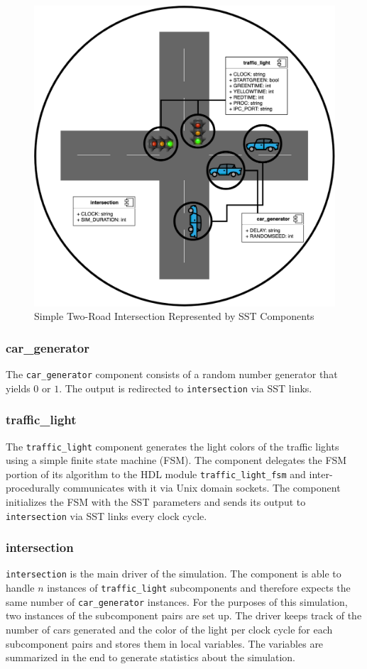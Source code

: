 \documentclass{article}
\begin{document}
      \begin{figure}[!h]
        \centering
        \includegraphics[width=4.5in]{diagrams/intersection_comp.png}
        \caption{Simple Two-Road Intersection Represented by SST Components}
        \label{fig:intersection_comp}
      \end{figure}

      \subsubsection{car\_generator}
      The \lstinline{car_generator} component consists of a random number generator that yields $0$
      or $1$. The output is redirected to \lstinline{intersection} via SST links.

      \subsubsection{traffic\_light}
      The \lstinline{traffic_light} component generates the light colors of the traffic lights using
      a simple finite state machine (FSM). The component delegates the FSM portion of its algorithm
      to the HDL module \lstinline{traffic_light_fsm} and inter-procedurally communicates with
      it via Unix domain sockets. The component initializes the FSM with the SST parameters and
      sends its output to \lstinline{intersection} via SST links every clock cycle.

      \subsubsection{intersection}
      \lstinline{intersection} is the main driver of the simulation. The component is able to handle
      $n$ instances of \lstinline{traffic_light} subcomponents and therefore expects the same number
      of \lstinline{car_generator} instances. For the purposes of this simulation, two instances of
      the subcomponent pairs are set up. The driver keeps track of the number of cars generated and
      the color of the light per clock cycle for each subcomponent pairs and stores them in local
      variables. The variables are summarized in the end to generate statistics about the
      simulation.
\end{document}
